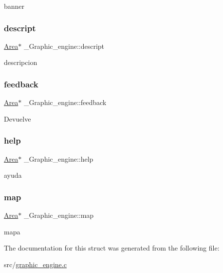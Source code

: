 banner \mbox{\label{struct__Graphic__engine_a414bb888ecce3389c7ce348264758e58}} 
\subsubsection{\texorpdfstring{descript}{descript}}
{\footnotesize\ttfamily \hyperlink{screen_8h_acfdfc42f6522d75fa3c16713afde8127}{Area}$\ast$ \+\_\+\+Graphic\+\_\+engine\+::descript}

descripcion \mbox{\label{struct__Graphic__engine_a4fc0ef353d000b20d57fb75d898c6d2d}} 
\subsubsection{\texorpdfstring{feedback}{feedback}}
{\footnotesize\ttfamily \hyperlink{screen_8h_acfdfc42f6522d75fa3c16713afde8127}{Area}$\ast$ \+\_\+\+Graphic\+\_\+engine\+::feedback}

Devuelve \mbox{\label{struct__Graphic__engine_ade1d3e95ad6def427f613a4a2d101875}} 
\subsubsection{\texorpdfstring{help}{help}}
{\footnotesize\ttfamily \hyperlink{screen_8h_acfdfc42f6522d75fa3c16713afde8127}{Area}$\ast$ \+\_\+\+Graphic\+\_\+engine\+::help}

ayuda \mbox{\label{struct__Graphic__engine_a1ea06bb881d335da8c31d63b3e834bdb}} 
\subsubsection{\texorpdfstring{map}{map}}
{\footnotesize\ttfamily \hyperlink{screen_8h_acfdfc42f6522d75fa3c16713afde8127}{Area}$\ast$ \+\_\+\+Graphic\+\_\+engine\+::map}

mapa 

The documentation for this struct was generated from the following file\+:\begin{DoxyCompactItemize}
\item 
src/\hyperlink{graphic__engine_8c}{graphic\+\_\+engine.\+c}\end{DoxyCompactItemize}

